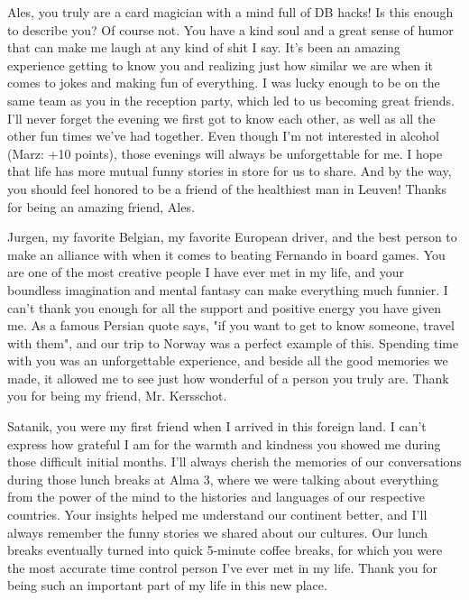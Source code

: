 Ales, you truly are a card magician with a mind full of DB hacks! Is this enough to describe you? Of course not. You have a kind soul and a great sense of humor that can make me laugh at any kind of shit I say. It's been an amazing experience getting to know you and realizing just how similar we are when it comes to jokes and making fun of everything. I was lucky enough to be on the same team as you in the reception party, which led to us becoming great friends. I'll never forget the evening we first got to know each other, as well as all the other fun times we've had together. Even though I'm not interested in alcohol (Marz: +10 points), those evenings will always be unforgettable for me. I hope that life has more mutual funny stories in store for us to share. And by the way, you should feel honored to be a friend of the healthiest man in Leuven! Thanks for being an amazing friend, Ales.

Jurgen, my favorite Belgian, my favorite European driver, and the best person to make an alliance with when it comes to beating Fernando in board games. You are one of the most creative people I have ever met in my life, and your boundless imagination and mental fantasy can make everything much funnier. I can't thank you enough for all the support and positive energy you have given me. As a famous Persian quote says, "if you want to get to know someone, travel with them", and our trip to Norway was a perfect example of this. Spending time with you was an unforgettable experience, and beside all the good memories we made, it allowed me to see just how wonderful of a person you truly are. Thank you for being my friend, Mr. Kersschot.

Satanik, you were my first friend when I arrived in this foreign land. I can't express how grateful I am for the warmth and kindness you showed me during those difficult initial months. I'll always cherish the memories of our conversations during those lunch breaks at Alma 3, where we were talking about everything from the power of the mind to the histories and languages of our respective countries. Your insights helped me understand our continent better, and I'll always remember the funny stories we shared about our cultures. Our lunch breaks eventually turned into quick 5-minute coffee breaks, for which you were the most accurate time control person I've ever met in my life. Thank you for being such an important part of my life in this new place.

